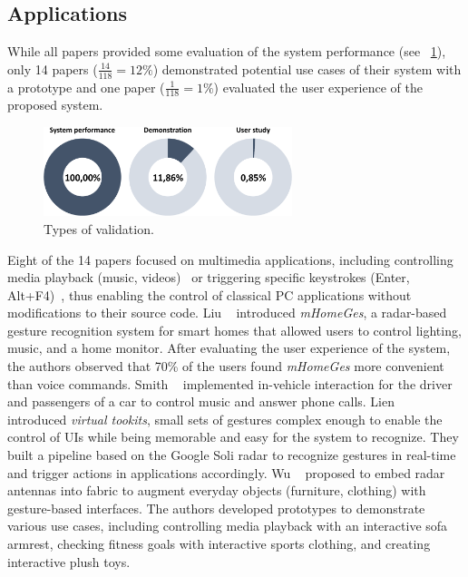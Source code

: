 \subsection{Applications} \label{sec:state_of_the_art:radar:applications}
While all papers provided some evaluation of the system performance (see \fig~\ref{fig:state_of_the_art:radar:validation-type}), only 14 papers ($\frac{14}{118}{=}12\%$) demonstrated potential use cases of their system with a prototype and one paper ($\frac{1}{118}{=}1\%$) evaluated the user experience of the proposed system.

\begin{figure}[t]
    \centering
    \includegraphics[height=2.6cm]{Figures/StateOfTheArt/Radar/evaluation-type.pdf}
    \caption{Types of validation.}
    \label{fig:state_of_the_art:radar:validation-type}
\end{figure}


Eight of the 14 papers focused on multimedia applications, including controlling media playback (\eg music, videos)~\cite{Du:2019,Lee:2020,Wu:2020,Smith:2018,Liu:2020b} or triggering specific keystrokes (\eg Enter, Alt+F4)~\cite{Nguyen:2018a,Nguyen:2018b}, thus enabling the control of classical PC applications without modifications to their source code.
Liu \etal~\cite{Liu:2020b} introduced \textit{mHomeGes}, a radar-based gesture recognition system for smart homes that allowed users to control lighting, music, and a home monitor. After evaluating the user experience of the system, the authors observed that 70\% of the users found \textit{mHomeGes} more convenient than voice commands.
Smith \etal~\cite{Smith:2018} implemented in-vehicle interaction for the driver and passengers of a car to control music and answer phone calls.
Lien \etal~\cite{Lien:2016} introduced \textit{virtual tookits}, \ie small sets of gestures complex enough to enable the control of UIs while being memorable and easy for the system to recognize. They built a pipeline based on the Google Soli radar to recognize gestures in real-time and trigger actions in applications accordingly.
Wu \etal~\cite{Wu:2020} proposed to embed radar antennas into fabric to augment everyday objects (\eg furniture, clothing) with gesture-based interfaces. The authors developed prototypes to demonstrate various use cases, including controlling media playback with an interactive sofa armrest, checking fitness goals with interactive sports clothing, and creating interactive plush toys.

